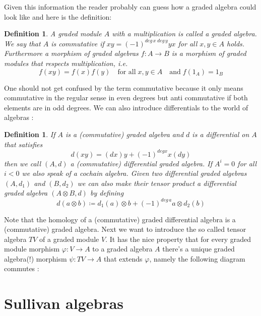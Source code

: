 \documentclass[12pt,a4paper]{scrartcl}
\newtheorem{Definition}[Theorem]{Definition}
\numberwithin{equation}{section}
\begin{document}
 Given this information the reader probably can guess how a graded algebra could look like and here is the definition:
\begin{Definition}
 A graded module $A$ with a multiplication is called a \emph{graded algebra}. We say that $A$ is \emph{commutative} if
 $xy = (-1)^{deg \, x \; deg \, y} yx$ for all $x,y \in A$ holds. Furthermore a \emph{morphism of graded algebras} 
 $f \colon A \to B$ is a morphism of graded modules that respects multiplication, i.e. 
 $$f(xy) = f(x)f(y) \quad \text{for all} \; x,y \in A \quad \text{and} \; f(1_A) = 1_B $$
\end{Definition}

One should not get confused by the term commutative because it only means commutative in the regular sense in even degrees but
anti commutative if both elements are in odd degrees.
We can also introduce differentials to the world of algebras :
\begin{Definition}
 If $A$ is a (commutative) graded algebra and $d$ is a differential on $A$ that satisfies 
 $$ d(xy) = (dx)y + (-1)^{deg x} x(dy)$$
 then we call $(A,d)$ a \emph{(commutative) differential graded algebra}. If $A^i = 0$ for all $i < 0$ we also
 speak of a \emph{cochain algebra}. \newline
 Given two differential graded algebras $(A,d_1)$ and $(B, d_2)$ we can also make their tensor product a 
 differential graded algebra $(A \otimes B, d)$ by defining 
 $$ d(a \otimes b) \coloneqq d_1(a) \otimes b + (-1)^{deg \, a} a \otimes d_2(b)$$
\end{Definition}

Note that the homology of a (commutative) graded differential algebra is a (commutative) graded algebra.
Next we want to introduce the so called tensor algebra $TV$ of a graded module $V$. It has the nice property
that for every graded module morphism $\varphi \colon V \to A$ to a graded algebra $A$ there's a unique 
graded algebra(!) morphism $\psi \colon TV \to A$ that extends $\varphi$, namely the following diagram commutes :


 \newpage  %
 
\section{Sullivan algebras}
\end{document}
